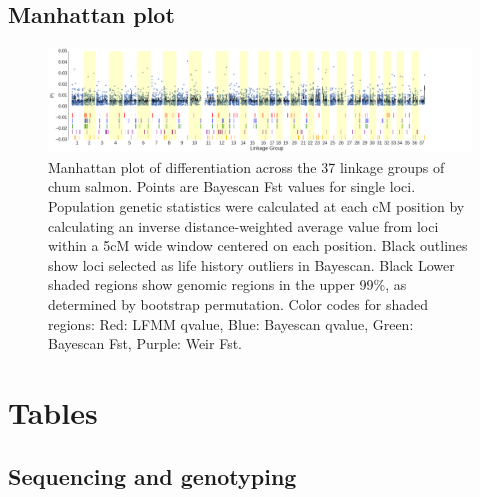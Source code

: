 \documentclass[12pt, one column]{article}
\begin{document}
\begin{landscape}
\subsection*{Manhattan plot}
\begin{figure}[H]
\includegraphics[scale=.25]{figures/Bayescan_Fst_and_bootstrap.png}
\caption[Manhattan plot]{Manhattan plot of differentiation across the 37 linkage groups of chum salmon.  Points are Bayescan Fst values for single loci. Population genetic statistics were calculated at each cM position by calculating an inverse distance-weighted average value from loci within a 5cM wide window centered on each position.  Black outlines show loci selected as life history outliers in Bayescan. Black Lower shaded regions show genomic regions in the upper 99\%, as determined by bootstrap permutation. Color codes for shaded regions: Red: LFMM qvalue, Blue: Bayescan qvalue, Green: Bayescan Fst, Purple: Weir Fst.}
\end{figure}
\end{landscape}
\section*{Tables}

\subsection*{Sequencing and genotyping}
\end{document}
